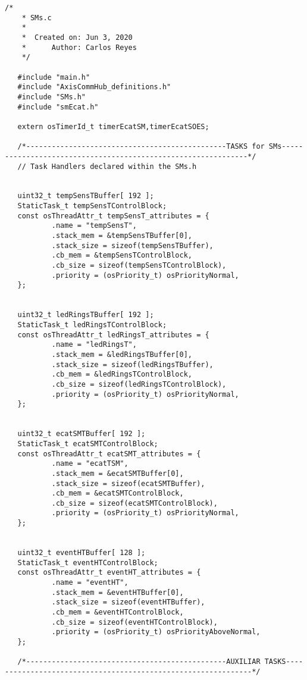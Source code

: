 \begin{lstlisting}[label=lst:generalSM,caption={Part of the code to declare threads and other auxiliar functions.}]
    /*
    * SMs.c
    *
    *  Created on: Jun 3, 2020
    *      Author: Carlos Reyes
    */
   
   #include "main.h"
   #include "AxisCommHub_definitions.h"
   #include "SMs.h"
   #include "smEcat.h"
   
   extern osTimerId_t timerEcatSM,timerEcatSOES;
   
   /*-----------------------------------------------TASKS for SMs--------------------------------------------------------------*/
   // Task Handlers declared within the SMs.h
   
   
   uint32_t tempSensTBuffer[ 192 ];
   StaticTask_t tempSensTControlBlock;
   const osThreadAttr_t tempSensT_attributes = {
           .name = "tempSensT",
           .stack_mem = &tempSensTBuffer[0],
           .stack_size = sizeof(tempSensTBuffer),
           .cb_mem = &tempSensTControlBlock,
           .cb_size = sizeof(tempSensTControlBlock),
           .priority = (osPriority_t) osPriorityNormal,
   };
   
   
   uint32_t ledRingsTBuffer[ 192 ];
   StaticTask_t ledRingsTControlBlock;
   const osThreadAttr_t ledRingsT_attributes = {
           .name = "ledRingsT",
           .stack_mem = &ledRingsTBuffer[0],
           .stack_size = sizeof(ledRingsTBuffer),
           .cb_mem = &ledRingsTControlBlock,
           .cb_size = sizeof(ledRingsTControlBlock),
           .priority = (osPriority_t) osPriorityNormal,
   };
   
   
   uint32_t ecatSMTBuffer[ 192 ];
   StaticTask_t ecatSMTControlBlock;
   const osThreadAttr_t ecatSMT_attributes = {
           .name = "ecatTSM",
           .stack_mem = &ecatSMTBuffer[0],
           .stack_size = sizeof(ecatSMTBuffer),
           .cb_mem = &ecatSMTControlBlock,
           .cb_size = sizeof(ecatSMTControlBlock),
           .priority = (osPriority_t) osPriorityNormal,
   };
   
   
   uint32_t eventHTBuffer[ 128 ];
   StaticTask_t eventHTControlBlock;
   const osThreadAttr_t eventHT_attributes = {
           .name = "eventHT",
           .stack_mem = &eventHTBuffer[0],
           .stack_size = sizeof(eventHTBuffer),
           .cb_mem = &eventHTControlBlock,
           .cb_size = sizeof(eventHTControlBlock),
           .priority = (osPriority_t) osPriorityAboveNormal,
   };
   
   /*-----------------------------------------------AUXILIAR TASKS--------------------------------------------------------------*/
   

\end{lstlisting}
